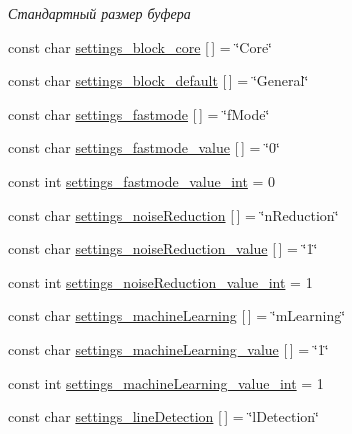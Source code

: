 \begin{DoxyCompactItemize}
\begin{DoxyCompactList}\small\item\em Стандартный размер буфера \end{DoxyCompactList}\item 
const char \mbox{\hyperlink{namespaceyenot_a2640b6ef7faaea51fd49edfd377c62a5}{settings\+\_\+block\+\_\+core}} \mbox{[}$\,$\mbox{]} = \char`\"{}Core\char`\"{}
\item 
const char \mbox{\hyperlink{namespaceyenot_a2c183b5b1119e19804dce22eaad06010}{settings\+\_\+block\+\_\+default}} \mbox{[}$\,$\mbox{]} = \char`\"{}General\char`\"{}
\item 
const char \mbox{\hyperlink{namespaceyenot_a49273bc3609e4a1d9c1a3e4a5cfcdafd}{settings\+\_\+fastmode}} \mbox{[}$\,$\mbox{]} = \char`\"{}f\+Mode\char`\"{}
\item 
const char \mbox{\hyperlink{namespaceyenot_a860366d2b9aa9cf0d9cdcaf58528c101}{settings\+\_\+fastmode\+\_\+value}} \mbox{[}$\,$\mbox{]} = \char`\"{}0\char`\"{}
\item 
const int \mbox{\hyperlink{namespaceyenot_aee49fb849c0951972cdac7466599314a}{settings\+\_\+fastmode\+\_\+value\+\_\+int}} = 0
\item 
const char \mbox{\hyperlink{namespaceyenot_a50716fcb731614c596c51676324c11e5}{settings\+\_\+noise\+Reduction}} \mbox{[}$\,$\mbox{]} = \char`\"{}n\+Reduction\char`\"{}
\item 
const char \mbox{\hyperlink{namespaceyenot_ae03e5eafa7f7253bce5126abe8575bfd}{settings\+\_\+noise\+Reduction\+\_\+value}} \mbox{[}$\,$\mbox{]} = \char`\"{}1\char`\"{}
\item 
const int \mbox{\hyperlink{namespaceyenot_aa228b5315065090d02dadbf128ba3d33}{settings\+\_\+noise\+Reduction\+\_\+value\+\_\+int}} = 1
\item 
const char \mbox{\hyperlink{namespaceyenot_a9e0a7decaab1ac67fda9bba816d240ad}{settings\+\_\+machine\+Learning}} \mbox{[}$\,$\mbox{]} = \char`\"{}m\+Learning\char`\"{}
\item 
const char \mbox{\hyperlink{namespaceyenot_ac24f2700516e72d7abda843c90ea197d}{settings\+\_\+machine\+Learning\+\_\+value}} \mbox{[}$\,$\mbox{]} = \char`\"{}1\char`\"{}
\item 
const int \mbox{\hyperlink{namespaceyenot_a14d42f7507a42b87ff62a9dc822c0af8}{settings\+\_\+machine\+Learning\+\_\+value\+\_\+int}} = 1
\item 
const char \mbox{\hyperlink{namespaceyenot_a49dc5e175f5b81894abe218db8949a89}{settings\+\_\+line\+Detection}} \mbox{[}$\,$\mbox{]} = \char`\"{}l\+Detection\char`\"{}

\end{DoxyCompactItemize}

